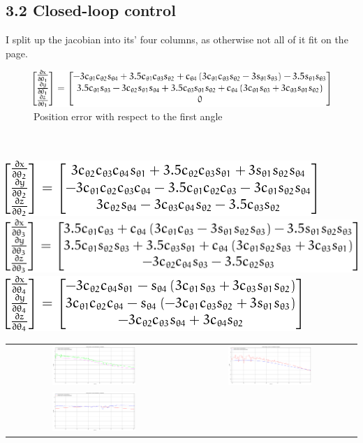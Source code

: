 \subsection{3.2 Closed-loop control}
I split up the jacobian into its' four columns, as otherwise not all of it fit on the page. \\
\begin{figure}
	\includegraphics[]{jac_col1.png}
	\caption{Position error with respect to the first angle}
\end{figure} \\ \\
\includegraphics[]{jac_col2.png} \\
\includegraphics[]{jac_col3.png} \\
\includegraphics[]{jac_col4.png} \\
\begin{tabular}{c c}
    \includegraphics[width=0.5\textwidth]{plots/closed_x.png} &
    \includegraphics[width=0.5\textwidth]{plots/closed_y.png} \\
    \includegraphics[width=0.5\textwidth]{plots/closed_z.png} &
\end{tabular}
